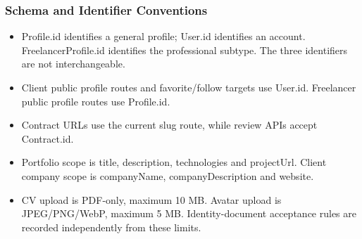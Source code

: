 \subsubsection{Schema and Identifier Conventions}
\begin{itemize}[leftmargin=1.7em,itemsep=2pt,topsep=3pt]
\item Profile.id identifies a general profile; User.id identifies an account. FreelancerProfile.id identifies the professional subtype. The three identifiers are not interchangeable.
\item Client public profile routes and favorite/follow targets use User.id. Freelancer public profile routes use Profile.id.
\item Contract URLs use the current slug route, while review APIs accept Contract.id.
\item Portfolio scope is title, description, technologies and projectUrl. Client company scope is companyName, companyDescription and website.
\item CV upload is PDF-only, maximum 10 MB. Avatar upload is JPEG/PNG/WebP, maximum 5 MB. Identity-document acceptance rules are recorded independently from these limits.
\end{itemize}
